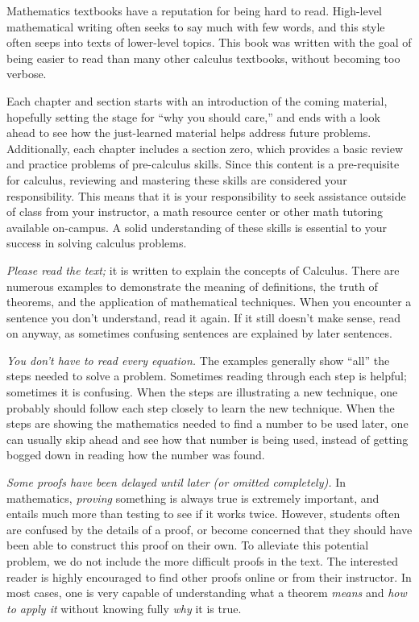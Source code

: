 Mathematics textbooks have a reputation for being hard to read. High-level mathematical writing often seeks to say much with few words, and this style often seeps into texts of lower-level topics. This book was written with the goal of being easier to read than many other calculus textbooks, without becoming too verbose. 

Each chapter and section starts with an introduction of the coming material, hopefully setting the stage for ``why you should care,'' and ends with a look ahead to see how the just-learned material helps address future problems. Additionally, each chapter includes a section zero, which provides a basic review and practice problems of pre-calculus skills. Since this content is a pre-requisite for calculus, reviewing and mastering these skills are considered your responsibility. This means that it is your responsibility to seek assistance outside of class from your instructor, a math resource center or other math tutoring available on-campus.  A solid understanding of these skills is essential to your success in solving calculus problems.

\emph{Please read the text;} it is written to explain the concepts of Calculus. There are numerous examples to demonstrate the meaning of definitions, the truth of theorems, and the application of mathematical techniques. When you encounter a sentence you don't understand, read it again. If it still doesn't make sense, read on anyway, as sometimes confusing sentences are explained by later sentences.

\emph{You don't have to read every equation.} The examples generally show ``all'' the steps needed to solve a problem. Sometimes reading through each step is helpful; sometimes it is confusing. When the steps are illustrating a new technique, one probably should follow each step closely to learn the new technique. When the steps are showing the mathematics needed to find a number to be used later, one can usually skip ahead and see how that number is being used, instead of getting bogged down in reading how the number was found.

\emph{Some proofs have been delayed until later (or omitted completely).} In mathematics, \emph{proving} something is always true is extremely important, and entails much more than testing to see if it works twice. However, students often are confused by the details of a proof, or become concerned that they should have been able to construct this proof on their own. To alleviate this potential problem, we do not include the more difficult proofs in the text. The interested reader is highly encouraged to find other proofs online or from their instructor. In most cases, one is very capable of understanding what a theorem \emph{means} and \emph{how to apply it} without knowing fully \emph{why} it is true.

